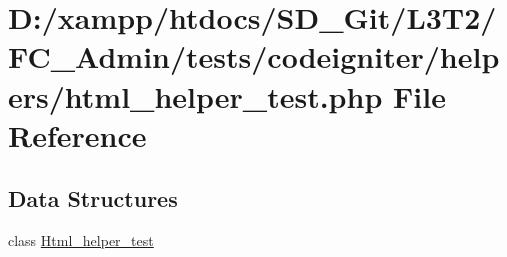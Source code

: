 \hypertarget{html__helper__test_8php}{}\section{D\+:/xampp/htdocs/\+S\+D\+\_\+\+Git/\+L3\+T2/\+F\+C\+\_\+\+Admin/tests/codeigniter/helpers/html\+\_\+helper\+\_\+test.php File Reference}
\label{html__helper__test_8php}
\subsection*{Data Structures}
\begin{DoxyCompactItemize}
\item 
class \hyperlink{class_html__helper__test}{Html\+\_\+helper\+\_\+test}
\end{DoxyCompactItemize}
